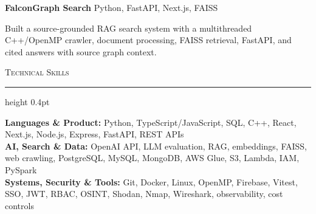 \documentclass[letterpaper,11pt]{article}
\newcommand{\resumesection}[1]{%
  \par\vspace{2pt}%
  {\large\scshape #1}\par\vspace{2pt}%
  \hrule height 0.4pt\vspace{2pt}%
}
\newcommand{\projectHeading}[2]{
  \textbf{#1} \hfill #2
}
\begin{document}
\projectHeading{FalconGraph Search}{Python, FastAPI, Next.js, FAISS}
\begin{tightitemize}
  \item Built a source-grounded RAG search system with a multithreaded C++/OpenMP crawler, document processing, FAISS retrieval, FastAPI, and cited answers with source graph context.
\end{tightitemize}

\resumesection{Technical Skills}
\textbf{Languages \& Product:} Python, TypeScript/JavaScript, SQL, C++, React, Next.js, Node.js, Express, FastAPI, REST APIs\\
\textbf{AI, Search \& Data:} OpenAI API, LLM evaluation, RAG, embeddings, FAISS, web crawling, PostgreSQL, MySQL, MongoDB, AWS Glue, S3, Lambda, IAM, PySpark\\
\textbf{Systems, Security \& Tools:} Git, Docker, Linux, OpenMP, Firebase, Vitest, SSO, JWT, RBAC, OSINT, Shodan, Nmap, Wireshark, observability, cost controls
\end{document}
